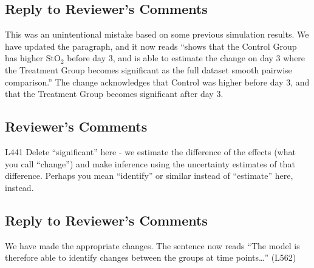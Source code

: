 \documentclass[
]{article}
\begin{document}
\hypertarget{section-37}{%
\subsection{\texorpdfstring{\textcolor{reviewersblue} {Reply to Reviewer's Comments}}{}}\label{section-37}}

This was an unintentional mistake based on some previous simulation results. We have updated the paragraph, and it now reads ``shows that the Control Group has higher \(\mbox{StO}_2\) before day 3, and is able to estimate the change on day 3 where the Treatment Group becomes significant as the full dataset smooth pairwise comparison.'' The change acknowledges that Control was higher before day 3, and that the Treatment Group becomes significant after day 3.

\hypertarget{reviewers-comments-37}{%
\subsection{Reviewer's Comments}\label{reviewers-comments-37}}

L441 Delete ``significant'' here - we estimate the difference of the effects (what you call ``change'') and make inference using the uncertainty estimates of that difference. Perhaps you mean ``identify'' or similar instead of ``estimate'' here, instead.

\hypertarget{section-38}{%
\subsection{\texorpdfstring{\textcolor{reviewersblue} {Reply to Reviewer's Comments}}{}}\label{section-38}}

We have made the appropriate changes. The sentence now reads ``The model is therefore able to identify changes between the groups at time points\ldots{}'' (L562)
\end{document}

